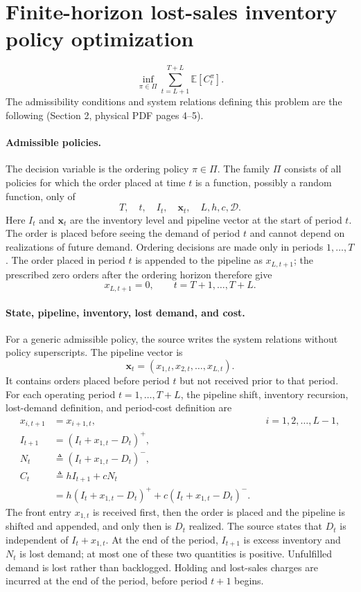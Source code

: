 \documentclass{article}
\begin{document}
\section*{Finite-horizon lost-sales inventory policy optimization}

\begin{equation}
\inf_{\pi\in\Pi}\sum_{t=L+1}^{T+L}\mathbb{E}[C_t^\pi].
\tag{1}
\end{equation}
The admissibility conditions and system relations defining this problem are the following (Section 2, physical PDF pages 4--5).

\paragraph{Admissible policies.}
The decision variable is the ordering policy $\pi\in\Pi$. The family $\Pi$ consists of all policies for which the order placed at time $t$ is a function, possibly a random function, only of
\[
T,\quad t,\quad I_t,\quad \mathbf{x}_t,\quad L,h,c,\mathcal{D}.
\]
Here $I_t$ and $\mathbf{x}_t$ are the inventory level and pipeline vector at the start of period $t$. The order is placed before seeing the demand of period $t$ and cannot depend on realizations of future demand. Ordering decisions are made only in periods $1,\ldots,T$. The order placed in period $t$ is appended to the pipeline as $x_{L,t+1}$; the prescribed zero orders after the ordering horizon therefore give
\[
x_{L,t+1}=0,\qquad t=T+1,\ldots,T+L.
\]

\paragraph{State, pipeline, inventory, lost demand, and cost.}
For a generic admissible policy, the source writes the system relations without policy superscripts. The pipeline vector is
\[
\mathbf{x}_t=(x_{1,t},x_{2,t},\ldots,x_{L,t}).
\]
It contains orders placed before period $t$ but not received prior to that period. For each operating period $t=1,\ldots,T+L$, the pipeline shift, inventory recursion, lost-demand definition, and period-cost definition are
\begin{align*}
x_{i,t+1}&=x_{i+1,t}, &&i=1,2,\ldots,L-1,\\
I_{t+1}&=(I_t+x_{1,t}-D_t)^+,\\
N_t&\triangleq (I_t+x_{1,t}-D_t)^-,\\
C_t&\triangleq hI_{t+1}+cN_t\\
   &=h(I_t+x_{1,t}-D_t)^+ + c(I_t+x_{1,t}-D_t)^-.
\end{align*}
The front entry $x_{1,t}$ is received first, then the order is placed and the pipeline is shifted and appended, and only then is $D_t$ realized. The source states that $D_t$ is independent of $I_t+x_{1,t}$. At the end of the period, $I_{t+1}$ is excess inventory and $N_t$ is lost demand; at most one of these two quantities is positive. Unfulfilled demand is lost rather than backlogged. Holding and lost-sales charges are incurred at the end of the period, before period $t+1$ begins.
\end{document}
